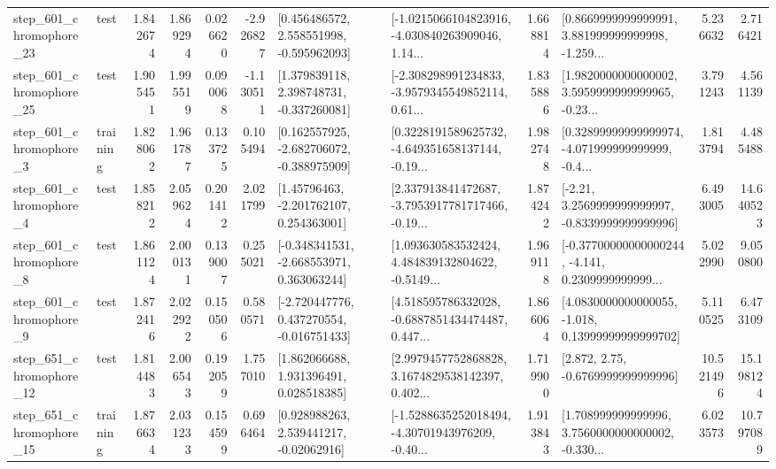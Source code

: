 \begin{tabular}{llrrrrllrlrr}
  step\_601\_chromophore\_23 &      test &      1.842674 &    1.869294 &      0.026620 & -2.926827 &    [0.456486572, 2.558551998, -0.595962093] &  [-1.0215066104823916, -4.030840263909046, 1.14... &       1.668814 &  [0.8669999999999991, 3.881999999999998, -1.259... &            5.236632 &          2.716421 \\
  step\_601\_chromophore\_25 &      test &      1.905451 &    1.995519 &      0.090068 & -1.130511 &    [1.379839118, 2.398748731, -0.337260081] &  [-2.308298991234833, -3.9579345549852114, 0.61... &       1.835886 &  [1.9820000000000002, 3.5959999999999965, -0.23... &            3.791243 &          4.561139 \\
   step\_601\_chromophore\_3 &  training &      1.828062 &    1.961787 &      0.133725 &  0.105494 &   [0.162557925, -2.682706072, -0.388975909] &  [0.3228191589625732, -4.649351658137144, -0.19... &       1.982748 &  [0.32899999999999974, -4.071999999999999, -0.4... &            1.813794 &          4.485488 \\
   step\_601\_chromophore\_4 &      test &      1.858212 &    2.059624 &      0.201412 &  2.021799 &     [1.45796463, -2.201762107, 0.254363001] &  [2.337913841472687, -3.7953917781717466, -0.19... &       1.874242 &   [-2.21, 3.2569999999999997, -0.8339999999999996] &            6.493005 &         14.640523 \\
   step\_601\_chromophore\_8 &      test &      1.861124 &    2.000131 &      0.139007 &  0.255021 &   [-0.348341531, -2.668553971, 0.363063244] &  [1.093630583532424, 4.484839132804622, -0.5149... &       1.969118 &  [-0.37700000000000244, -4.141, 0.2309999999999... &            5.022990 &          9.050800 \\
   step\_601\_chromophore\_9 &      test &      1.872416 &    2.022922 &      0.150506 &  0.580571 &   [-2.720447776, 0.437270554, -0.016751433] &  [4.518595786332028, -0.6887851434474487, 0.447... &       1.866064 &  [4.0830000000000055, -1.018, 0.13999999999999702] &            5.110525 &          6.473109 \\
  step\_651\_chromophore\_12 &      test &      1.814483 &    2.006543 &      0.192059 &  1.757010 &     [1.862066688, 1.931396491, 0.028518385] &  [2.9979457752868828, 3.1674829538142397, 0.402... &       1.719900 &                 [2.872, 2.75, -0.6769999999999996] &           10.521496 &         15.198124 \\
  step\_651\_chromophore\_15 &  training &      1.876634 &    2.031233 &      0.154599 &  0.696464 &     [0.928988263, 2.539441217, -0.02062916] &  [-1.5288635252018494, -4.30701943976209, -0.40... &       1.913843 &  [1.708999999999996, 3.7560000000000002, -0.330... &            6.023573 &         10.797089 \\

\end{tabular}
